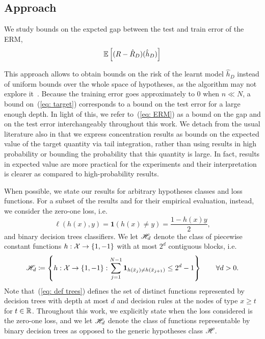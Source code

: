 \documentclass[reqno]{amsart}
\begin{document}
\subsection{Approach}
We study bounds on the expcted gap between the test and train error of the ERM, \begin{equation} \label{eq: target}
\mathbb{E}\left[(R - \hat R_D)(\hat h_D)\right]
\end{equation}

This approach allows to obtain bounds on the risk of the learnt model $\hat h_D$ instead of uniform bounds over the whole space of hypotheses, as the algorithm may not explore it~\cite{bousquet2002stability,nagarajan2019uniform}. Because the training error goes approximately to $0$ when $n\ll N$, a bound on~(\ref{eq: target}) corresponds to a bound on the test error for a large enough depth. In light of this, we refer to~(\ref{eq: ERM}) as a bound on the gap and on the test error interchangeably throughout this work.
We detach from the usual literature also in that we express concentration results as bounds on the expected value of the target quantity via tail integration, rather than using results in high probability or bounding the probability that this quantity is large. In fact, results in expected value are more practical for the experiments and their interpretation is clearer as compared to high-probability results. 

When possible, we state our results for arbitrary hypotheses classes and loss functions. 
For a subset of the results and for their empirical evaluation, instead, we consider the zero-one loss, i.e. 
\[\ell(h(x), y) = \mathbf{1} (h(x)\neq y) = \frac{1 - h(x)y}{2}, \] and binary decision trees classifiers. 
We let $\mathscr{H}_d$ denote the class of piecewise constant functions $h:\mathcal{X} \to \{1,-1\}$ with at most $2^d$ contiguous blocks, i.e. 
\begin{equation}\label{eq: def trees}
\mathscr{H}_d \coloneq \left\{ h:\mathcal{X} \to \{1,-1\} : \sum_{j=1}^{N-1} \mathbf{1}_{h(\bar x_j) \neq h(\bar x_{j+1})} \le 2^{d}-1 \right\} \qquad \forall d>0.
\end{equation}
Note that~(\ref{eq: def trees}) defines the set of distinct functions represented by decision trees with depth at most $d$ and decision rules at the nodes of type $x\ge t$ for $t\in\mathbb{R}$. 
Throughout this work, we explicitly state when the loss considered is the zero-one loss, and we let $\mathscr{H}_d$ denote the class of functions representable by binary decision trees as opposed to the generic hypotheses class $\mathscr{H}$. 
\end{document}
